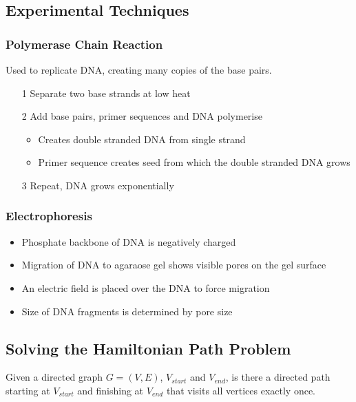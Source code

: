 \documentclass[a4paper]{article}
\begin{document}
\subsection{Experimental Techniques}

\subsubsection{Polymerase Chain Reaction}

Used to replicate DNA, creating many copies of the base pairs.

\begin{enumerate}
  \item[1] Separate two base strands at low heat
  \item[2] Add base pairs, primer sequences and DNA polymerise
    \begin{itemize}
      \item Creates double stranded DNA from single strand
      \item Primer sequence creates seed from which the double stranded DNA
            grows
    \end{itemize}
  \item[3] Repeat, DNA grows exponentially
\end{enumerate}

\subsubsection{Electrophoresis}

\begin{itemize}
  \item Phosphate backbone of DNA is negatively charged
  \item Migration of DNA to agaraose gel shows visible pores on the gel surface
  \item An electric field is placed over the DNA to force migration
  \item Size of DNA fragments is determined by pore size
\end{itemize}

\subsection{Solving the Hamiltonian Path Problem}

Given a directed graph $G=(V,E)$, $V_{start}$ and $V_{end}$, is there a directed
path starting at $V_{start}$ and finishing at $V_{end}$ that visits all vertices
exactly once.
\end{document}
